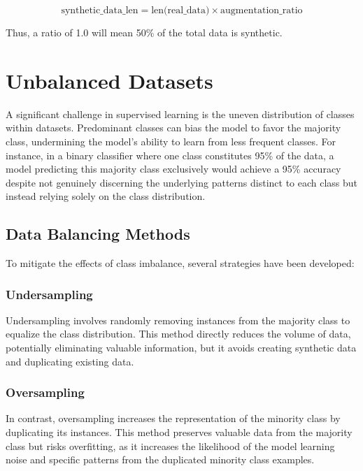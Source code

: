 \begin{equation}
\text{synthetic\_data\_len} = \text{len(real\_data)} \times \text{augmentation\_ratio}
\end{equation}

Thus, a ratio of 1.0 will mean 50\% of the total data is synthetic. 

\section{Unbalanced Datasets}
\label{unbalanced_dataset_theory}
A significant challenge in supervised learning is the uneven distribution of classes within datasets. Predominant classes can bias the model to favor the majority class, undermining the model's ability to learn from less frequent classes. For instance, in a binary classifier where one class constitutes 95\% of the data, a model predicting this majority class exclusively would achieve a 95\% accuracy despite not genuinely discerning the underlying patterns distinct to each class but instead relying solely on the class distribution.

\subsection{Data Balancing Methods}
To mitigate the effects of class imbalance, several strategies have been developed\cite{10061154}: 

\subsubsection{Undersampling}
Undersampling involves randomly removing instances from the majority class to equalize the class distribution. This method directly reduces the volume of data, potentially eliminating valuable information, but it avoids creating synthetic data and duplicating existing data.

\subsubsection{Oversampling}
In contrast, oversampling increases the representation of the minority class by duplicating its instances. This method preserves valuable data from the majority class but risks overfitting, as it increases the likelihood of the model learning noise and specific patterns from the duplicated minority class examples.

